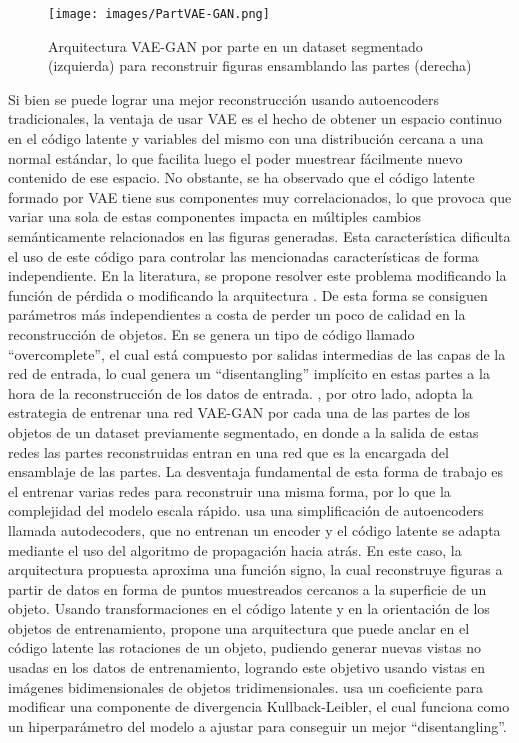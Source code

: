 \documentclass[spanish]{article}
\begin{document}
\begin{figure}[h]
\texttt{[image: images/PartVAE-GAN.png]}
\centering
\caption{Arquitectura VAE-GAN por parte en un dataset segmentado (izquierda) para reconstruir figuras ensamblando las partes (derecha) \cite{Li2019}}
\label{PartVAE-GAN}
\end{figure}

Si bien se puede lograr una mejor reconstrucción usando autoencoders tradicionales, la ventaja de usar
VAE es el hecho de obtener un espacio continuo en el código latente y variables del mismo con una
distribución cercana a una normal estándar, lo que facilita luego el poder muestrear fácilmente nuevo
contenido de ese espacio. No obstante, se ha observado \cite{Higgins2017, burgess2018understanding}
que el código latente formado por VAE tiene sus componentes muy correlacionados, lo que provoca que
variar una sola de estas componentes impacta en múltiples cambios semánticamente relacionados en las
figuras generadas. Esta característica dificulta el uso de este código para controlar las mencionadas
características de forma independiente. En la literatura, se propone resolver este problema modificando
la función de pérdida \cite{Higgins2017} o modificando la arquitectura \cite{Li2019, Yin2019}. De esta
forma se consiguen parámetros más independientes a costa de perder un poco de calidad en la
reconstrucción de objetos. En \cite{Yin2019} se genera un tipo de código llamado ``overcomplete'', el
cual está compuesto por salidas intermedias de las capas de la red de entrada, lo cual genera un
``disentangling'' implícito en estas partes a la hora de la reconstrucción de los datos de entrada.
\cite{Li2019}, por otro lado, adopta la estrategia de entrenar una red VAE-GAN por cada una de las
partes de los objetos de un dataset previamente segmentado, en donde a la salida de estas redes las
partes reconstruidas entran en una red que es la encargada del ensamblaje de las partes. La desventaja
fundamental de esta forma de trabajo es el entrenar varias redes para reconstruir una misma forma, por
lo que la complejidad del modelo escala rápido. \cite{Park2019} usa una simplificación de autoencoders
llamada autodecoders, que no entrenan un encoder y el código latente se adapta mediante el uso del
algoritmo de propagación hacia atrás. En este caso, la arquitectura propuesta aproxima una función
signo, la cual reconstruye figuras a partir de datos en forma de puntos muestreados cercanos a la
superficie de un objeto. Usando transformaciones en el código latente y en la orientación de los
objetos de entrenamiento, \cite{Olszewski2019} propone una arquitectura que puede anclar en el código
latente las rotaciones de un objeto, pudiendo generar nuevas vistas no usadas en los datos de
entrenamiento, logrando este objetivo usando vistas en imágenes bidimensionales de objetos
tridimensionales. \cite{Higgins2017} usa un coeficiente para modificar una componente de divergencia
Kullback-Leibler, el cual funciona como un hiperparámetro del modelo a ajustar para conseguir un mejor
``disentangling''.
\end{document}
